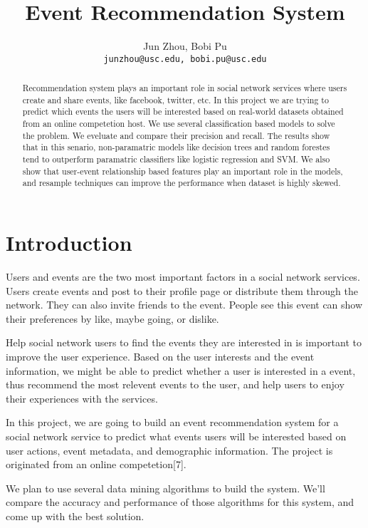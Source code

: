 \documentclass{article} %
\title{Event Recommendation System}
\author{
Jun Zhou, Bobi Pu \\
\texttt{junzhou@usc.edu, bobi.pu@usc.edu} \\
}
\begin{document}
\maketitle

\begin{abstract}
Recommendation system plays an important role in social network services where users create and share events, like facebook, twitter, etc. In this project we are trying to predict which events the users will be interested based on real-world datasets obtained from an online competetion host. We use several classification based models to solve the problem. We eveluate and compare their precision and recall. The results show that in this senario, non-paramatric models like decision trees and random forestes tend to outperform paramatric classifiers like logistic regression and SVM. We also show that user-event relationship based features play an important role in the models, and resample techniques can improve the performance when dataset is highly skewed.
\end{abstract}

\section{Introduction}

Users and events are the two most important factors in a social network services. Users create events and post to their profile page or distribute them through the network. They can also invite friends to the event. People see this event can show their preferences by like, maybe going, or dislike. 

Help social network users to find the events they are interested in is important to improve the user experience. Based on the user interests and the event information, we might be able to predict whether a user is interested in a event, thus recommend the most relevent events to the user, and help users to enjoy their experiences with the services.

In this project, we are going to build an event recommendation system for a social network service to predict what events users will be interested based on user actions, event metadata, and demographic information. The project is originated from an online competetion[7].

We plan to use several data mining algorithms to build the system. We'll compare the accuracy and performance of those algorithms for this system, and come up with the best solution.
\end{document}

